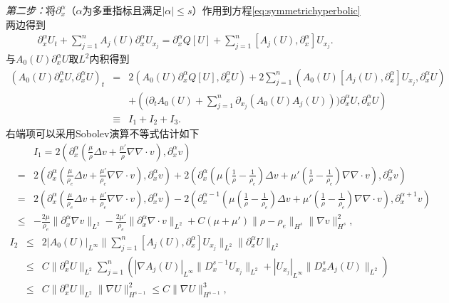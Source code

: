 \emph{第二步：}将$\partial_x^\alpha$（$\alpha$为多重指标且满足$|\alpha|\le s$）作用到方程\eqref{eq:symmetrichyperbolic}两边得到
\begin{eqnarray}\label{eq:higher}
    \partial_x^\alpha U_t + \sum_{j=1}^n A_j(U) \partial_x^\alpha U_{x_j} = \partial_x^\alpha Q[U] + \sum_{j=1}^n [A_j(U),\partial_x^\alpha] U_{x_j}.
\end{eqnarray}
与$A_0(U) \partial_x^\alpha U$取$L^2$内积得到
\begin{eqnarray}\label{eq:HighOrderInner}
  (A_0(U) \partial_x^\alpha U, \partial_x^\alpha U)_t
 & = & 2(A_0(U) \partial_x^\alpha Q[U],\partial_x^\alpha U) + 2 \sum_{j=1}^n (A_0(U) [A_j(U),\partial_x^\alpha]U_{x_j},\partial_x^\alpha U)  \nonumber\\
  &&+ \left( \big( \partial_t A_0(U) + \sum_{j=1}^n \partial_{x_j} (A_0(U) A_j(U))\big) \partial_x^\alpha U,\partial_x^\alpha U \right)  \\
  &\equiv& I_1 + I_2 + I_3 .  \nonumber
\end{eqnarray}
右端项可以采用Sobolev演算不等式\cite{majda2012compressible}估计如下
\begin{eqnarray*}
 && I_1 = 2(\partial_x^\alpha(\frac{\mu}{\rho} \Delta  v  + \frac{\mu'}{\rho} \nabla \nabla \cdot  v ), \partial_x^\alpha  v ) \\
  &=& 2(\partial_x^\alpha (\frac{\mu}{\rho_e} \Delta  v  + \frac{\mu'}{\rho_e} \nabla \nabla \cdot  v ), \partial_x^\alpha  v ) + 2( \partial_x^\alpha ( \mu (\frac{1}{\rho}-\frac{1}{\rho_e}) \Delta  v  + \mu'(\frac{1}{\rho} - \frac{1}{\rho_e}) \nabla \nabla \cdot  v ), \partial_x^\alpha v ) \\
  &=& 2(\partial_x^\alpha (\frac{\mu}{\rho_e} \Delta  v  + \frac{\mu'}{\rho_e} \nabla \nabla \cdot  v ), \partial_x^\alpha  v )
  - 2( \partial_x^{\alpha-1} ( \mu (\frac{1}{\rho}-\frac{1}{\rho_e}) \Delta  v  + \mu'(\frac{1}{\rho} - \frac{1}{\rho_e}) \nabla \nabla \cdot  v ),\partial_x^{\alpha +1}  v ) \\
  &\le& -\frac{2\mu}{\rho_e} \|\partial_x^\alpha \nabla  v \|_{L^2}  -\frac{2\mu'}{\rho_e} \|\partial_x^\alpha \nabla \cdot  v \|_{L^2} + C(\mu+\mu')\| \rho -\rho_e \|_{H^s} \|\nabla  v \|_{H^s}^2 ,
\end{eqnarray*}
\begin{eqnarray*}
  I_2 &\le& 2|A_0(U)|_{L^\infty} \|\sum_{j=1}^n [A_j(U),\partial_x^\alpha]U_{x_j} \|_{L^2} \|\partial_x^\alpha U\|_{L^2} \\
  &\le& C \|\partial_x^\alpha U\|_{L^2} \sum_{j=1}^n (|\nabla A_j(U)|_{L^\infty} \|D^{s-1}_x U_{x_j}\|_{L^2}+ |U_{x_j}|_{L^\infty} \|D^s_x A_j(U)\|_{L^2}) \\
  &\le& C \|\partial_x^\alpha U\|_{L^2} \|\nabla U\|_{H^{s-1}}^2 \le C\|\nabla U\|_{H^{s-1}}^3,
\end{eqnarray*}
